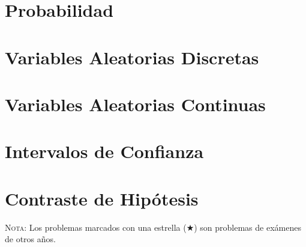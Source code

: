 \documentclass[a4paper,titlepage,dvips]{article}
\begin{document}
\section{Probabilidad}
\begin{enumerate}[leftmargin=*]
\end{enumerate}

\section{Variables Aleatorias Discretas}
\begin{enumerate}[leftmargin=*]
\end{enumerate}

\section{Variables Aleatorias Continuas}
\begin{enumerate}[leftmargin=*]
\end{enumerate}

\section{Intervalos de Confianza}
\begin{enumerate}[leftmargin=*]
\end{enumerate}

\section{Contraste de Hipótesis}
\begin{enumerate}[leftmargin=*]
\end{enumerate}

%


\vspace{2cm}

\textsc{Nota}: Los problemas marcados con una estrella ($\bigstar$) son problemas de exámenes de otros años.
\end{document}
